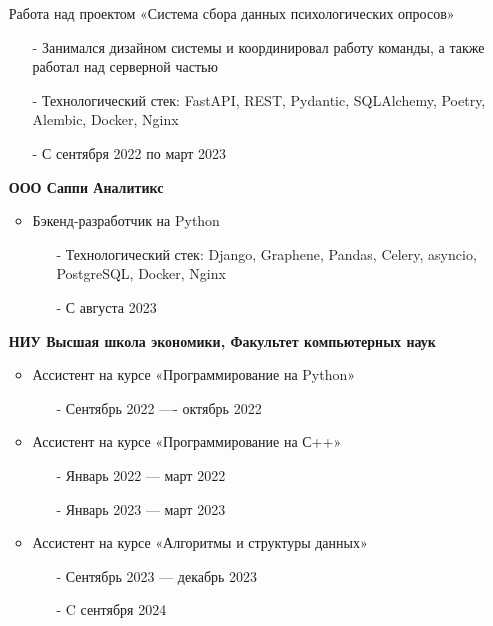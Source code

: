 \documentclass[10pt,a4paper]{altacv}
\begin{document}
\begin{itemize}

\item[] Работа над проектом «Система сбора данных психологических опросов» 
\begin{itemize}
    \item[-] Занимался дизайном системы и координировал работу команды, а также работал над серверной частью
    \item[-] Технологический стек: FastAPI, REST, Pydantic, SQLAlchemy, Poetry, Alembic, Docker, Nginx
    \item[-] С сентября 2022 по март 2023
\end{itemize}

\item[] \textbf{ООО Саппи Аналитикс}
\begin{itemize}
    \item Бэкенд-разработчик на Python
    \begin{itemize}
        \item[-] Технологический стек: Django, Graphene, Pandas, Celery, asyncio, PostgreSQL, Docker, Nginx
        \item[-] С августа 2023
    \end{itemize}
\end{itemize}

\item[] \textbf{НИУ Высшая школа экономики, Факультет компьютерных наук}
\begin{itemize}
    \item Ассистент на курсе «Программирование на Python»
    \begin{itemize}
        \item[-] Сентябрь 2022 ---- октябрь 2022
    \end{itemize}
    \item Ассистент на курсе «Программирование на С++»
    \begin{itemize}
        \item[-] Январь 2022 --- март 2022
        \item[-] Январь 2023 --- март 2023
    \end{itemize}
    \item Ассистент на курсе «Алгоритмы и структуры данных»
    \begin{itemize}
        \item[-] Сентябрь 2023 --- декабрь 2023
        \item[-] C сентября 2024
    \end{itemize}
\end{itemize}


\end{itemize}
\end{document}
